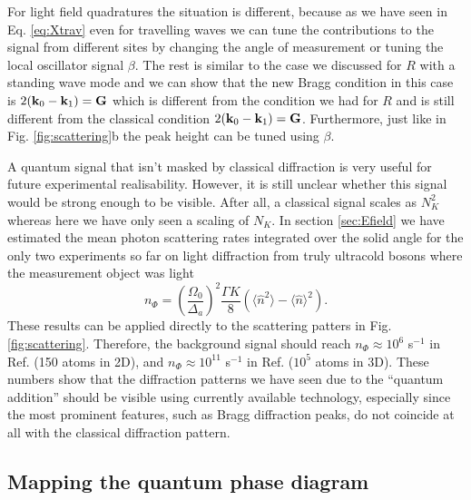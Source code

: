 For light field quadratures the situation is different, because as we
have seen in Eq. \eqref{eq:Xtrav} even for travelling waves we can
tune the contributions to the signal from different sites by changing
the angle of measurement or tuning the local oscillator signal
$\beta$. The rest is similar to the case we discussed for $R$ with a
standing wave mode and we can show that the new Bragg condition in
this case is $2 (\mathbf{k}_0 - \mathbf{k}_1) = \mathbf{G}$ which is different from
the condition we had for $R$ and is still different from the classical
condition $2 (\mathbf{k}_0 - \mathbf{k}_1) = \mathbf{G}$. Furthermore, just like in
Fig. \ref{fig:scattering}b the peak height can be tuned using $\beta$.

A quantum signal that isn't masked by classical diffraction is very
useful for future experimental realisability. However, it is still
unclear whether this signal would be strong enough to be
visible. After all, a classical signal scales as $N_K^2$ whereas here
we have only seen a scaling of $N_K$. In section \ref{sec:Efield} we
have estimated the mean photon scattering rates integrated over the
solid angle for the only two experiments so far on light diffraction
from truly ultracold bosons where the measurement object was light
\begin{equation} 
  n_{\Phi}= \left(\frac{\Omega_0}{\Delta_a}\right)^2 \frac{\Gamma K}{8}
  (\langle\hat{n}^2\rangle-\langle\hat{n}\rangle^2).
\end{equation} 
These results can be applied directly to the scattering patters in
Fig. \ref{fig:scattering}. Therefore, the background signal should
reach $n_\Phi \approx 10^6$ s$^{-1}$ in Ref. \cite{weitenberg2011}
(150 atoms in 2D), and $n_\Phi \approx 10^{11}$ s$^{-1}$ in
Ref. \cite{miyake2011} ($10^5$ atoms in 3D). These numbers show that
the diffraction patterns we have seen due to the ``quantum addition''
should be visible using currently available technology, especially
since the most prominent features, such as Bragg diffraction peaks, do
not coincide at all with the classical diffraction pattern.

\subsection{Mapping the quantum phase diagram}

